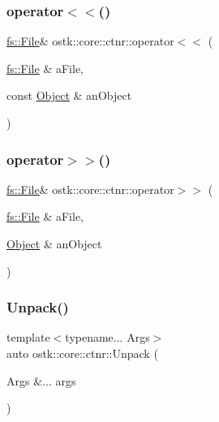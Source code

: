 \mbox{\label{namespaceostk_1_1core_1_1ctnr_ad662a1eb6b984c689ca0bdb25d8f4c90}} 
\subsubsection{\texorpdfstring{operator$<$$<$()}{operator<<()}\hspace{0.1cm}{\footnotesize\ttfamily [4/4]}}
{\footnotesize\ttfamily \hyperlink{classostk_1_1core_1_1fs_1_1_file}{fs\+::\+File}\& ostk\+::core\+::ctnr\+::operator$<$$<$ (\begin{DoxyParamCaption}\item[{\hyperlink{classostk_1_1core_1_1fs_1_1_file}{fs\+::\+File} \&}]{a\+File,  }\item[{const \hyperlink{classostk_1_1core_1_1ctnr_1_1_object}{Object} \&}]{an\+Object }\end{DoxyParamCaption})}

\mbox{\label{namespaceostk_1_1core_1_1ctnr_a5dd7118475404fb96f6900bd5b1ccfc8}} 
\subsubsection{\texorpdfstring{operator$>$$>$()}{operator>>()}}
{\footnotesize\ttfamily \hyperlink{classostk_1_1core_1_1fs_1_1_file}{fs\+::\+File}\& ostk\+::core\+::ctnr\+::operator$>$$>$ (\begin{DoxyParamCaption}\item[{\hyperlink{classostk_1_1core_1_1fs_1_1_file}{fs\+::\+File} \&}]{a\+File,  }\item[{\hyperlink{classostk_1_1core_1_1ctnr_1_1_object}{Object} \&}]{an\+Object }\end{DoxyParamCaption})}

\mbox{\label{namespaceostk_1_1core_1_1ctnr_a625c2cc96b397db1d78934d7fc9d55d4}} 
\subsubsection{\texorpdfstring{Unpack()}{Unpack()}}
{\footnotesize\ttfamily template$<$typename... Args$>$ \\
auto ostk\+::core\+::ctnr\+::\+Unpack (\begin{DoxyParamCaption}\item[{Args \&...}]{args }\end{DoxyParamCaption})}

